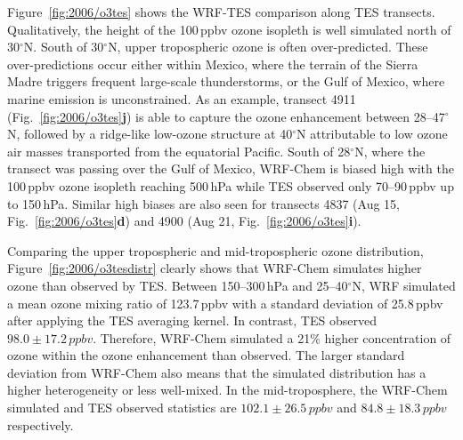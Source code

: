 Figure~\ref{fig:2006/o3tes} shows the WRF-TES comparison along TES transects. Qualitatively, the height of the 100\,\unit{ppbv} ozone
isopleth is well simulated north of 30$^\circ$N. South of 30$^\circ$N, upper tropospheric ozone is often over-predicted. These over-predictions
occur either within Mexico, where the terrain of the  Sierra Madre triggers frequent large-scale thunderstorms, or the Gulf of Mexico, where {\lnox}
marine emission is unconstrained. As an example, transect 4911 (Fig.~\ref{fig:2006/o3tes}{\bf j}) is able to capture the ozone enhancement
between 28--47$^\circ$N, followed by a ridge-like low-ozone structure at 40$^\circ$N attributable to low ozone air masses transported
from the equatorial Pacific. South of 28$^\circ$N, where the transect was passing over the Gulf of Mexico, WRF-Chem is biased high
with the 100\,\unit{ppbv} ozone isopleth reaching 500\,\unit{hPa} while TES observed only 70--90\,\unit{ppbv} up to 150\,\unit{hPa}.
Similar high biases are also seen for transects 4837 (Aug 15, Fig.~\ref{fig:2006/o3tes}{\bf d}) and 4900 (Aug 21,
Fig.~\ref{fig:2006/o3tes}{\bf i}).

Comparing the upper tropospheric and mid-tropospheric ozone distribution, Figure~\ref{fig:2006/o3tesdistr} clearly shows that WRF-Chem
simulates higher ozone than observed by TES. Between 150--300\,\unit{hPa} and 25--40$^\circ$N, WRF simulated
a mean ozone mixing ratio of 123.7\,\unit{ppbv} with a standard deviation of 25.8\,\unit{ppbv} after applying the TES averaging kernel. In contrast,
TES observed $98.0\pm17.2\,\unit{ppbv}$. Therefore, WRF-Chem simulated a 21\% higher concentration of ozone within the ozone
enhancement than observed. The larger standard deviation from WRF-Chem also means that the simulated distribution has a higher
heterogeneity or less well-mixed. In the mid-troposphere, the WRF-Chem simulated and TES observed statistics are $102.1\pm26.5\,\unit{ppbv}$
and $84.8\pm18.3\,\unit{ppbv}$ respectively.

